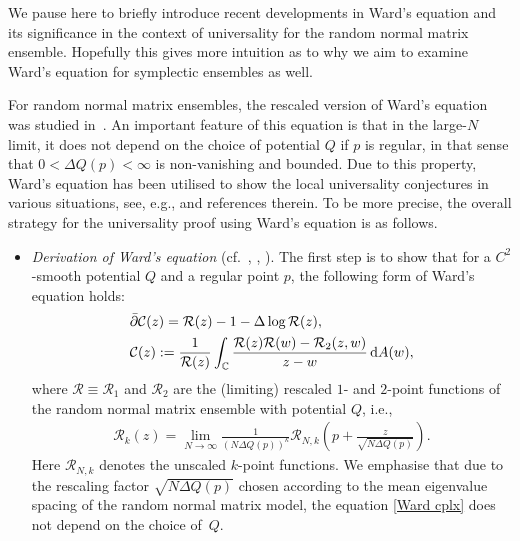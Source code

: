 \documentclass[pdftex]{sigma}
\numberwithin{equation}{section}
\newcommand{\C}{{\mathbb C}}
\newcommand{\1}{\chi}
\def\bp{{\bar\partial}}
\begin{document}
\begin{Remark}
We pause here to briefly introduce recent developments in Ward's equation and its significance in the context of universality for the random normal matrix ensemble.
Hopefully this gives more intuition as to why we aim to examine Ward's equation for symplectic ensembles as well.

For random normal matrix ensembles, the rescaled version of Ward's equation was studied in~\cite{MR3975882}. An important feature of this equation is that in the large-$N$ limit, it does not depend on the choice of potential $Q$ if $p$ is regular, in that sense that $0<\Delta Q(p) <\infty$ is non-vanishing and bounded. Due to this property, Ward's equation has been utilised to show the local universality conjectures in various situations, see, e.g., \cite{AB21, MR4030288, ameur2018random} and references therein.
To be more precise, the overall strategy for the universality proof using Ward's equation is as follows.
\begin{itemize}\itemsep=0pt
 \item \emph{Derivation of Ward's equation} (cf.\ \cite[Theorem~1.3]{MR3975882}, \cite[Lemma~2]{MR4030288}, \cite[Lemma~3.1]{ameur2018random}). The first step is to show that for a $C^2$-smooth potential $Q$ and a regular point $p$, the following form of Ward's equation holds:
 \begin{gather}\begin{split}
 & \bp \mathcal{C}(z)=\mathcal{R}(z)-1-\Delta \log \mathcal{R}(z), \\
 & \mathcal{C}(z):=\frac{1}{\mathcal{R}(z)}\int_\C \frac{\mathcal{R}(z)\mathcal{R}(w)-\mathcal{R}_2(z,w)}{z-w}\,{\rm d}A(w),
 \end{split}\label{Ward cplx}
 \end{gather}
 where $\mathcal{R} \equiv \mathcal{R}_1$ and $\mathcal{R}_2$ are the (limiting) rescaled $1$- and $2$-point functions of the random normal matrix ensemble with potential $Q$, i.e.,
 \begin{gather*}
 \mathcal{R}_k(z)=\lim_{N \to \infty} \frac{1}{(N \Delta Q(p))^k} \boldsymbol{\mathcal{R}}_{N,k}\left(p+\frac{z}{\sqrt{N\Delta Q(p)}}\right).
 \end{gather*}
 Here $\boldsymbol{\mathcal{R}}_{N,k}$ denotes the unscaled $k$-point functions.
 We emphasise that due to the rescaling factor $\sqrt{N\Delta Q(p)}$ chosen according to the mean eigenvalue spacing of the random normal matrix model, the equation \eqref{Ward cplx} does not depend on the choice of~$Q$.

\end{itemize}
\end{Remark}
\end{document}
